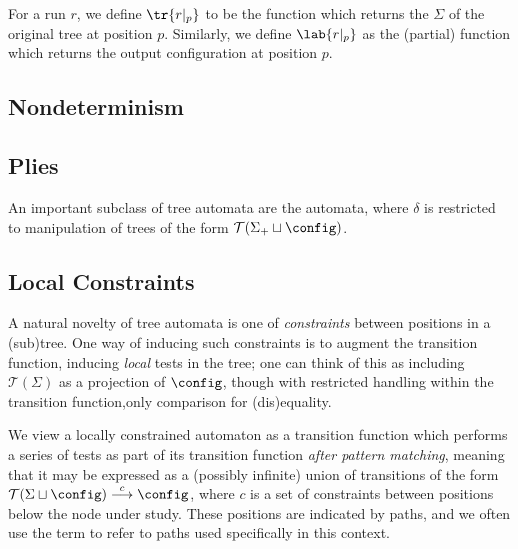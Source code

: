 For a run $r$, we define $\tr{r|_p}$ to be the function which returns the
$\Sigma$ of the original tree at position $p$.
Similarly, we define 
$\lab{r|_p}$ as the (partial) function which returns
the output configuration at position $p$.

\subsection{Nondeterminism}

\subsection{Plies}

An important subclass of tree automata are the  automata,
where $\delta$ is restricted to manipulation of trees of the form
$\mathcal{T}(\Sigma_+ \sqcup \config)$.

% 

\subsection{Local Constraints}
\label{sec:treeaut:con:loc}

A natural novelty of tree automata is one of {\em constraints} between
positions in a (sub)tree.  One way of inducing such constraints is to
augment the transition function, inducing {\em local} tests in the tree; one
can think of this as including $\mathcal{T}(\Sigma)$ as a projection of
$\config$, though with restricted handling within the transition
function,\eg only comparison for (dis)equality.

We view a locally constrained automaton as a transition function which
performs a series of tests as part of its transition function {\em after
pattern matching}, meaning that it may be expressed as a (possibly infinite)
union of transitions of the form $\mathcal{T}(\Sigma \sqcup \config)
\stackrel{c}{\longrightarrow} \config$, where $c$ is a set of constraints
between positions below the node under study.  These positions are indicated
by paths, and we often use the term  to refer to paths
used specifically in this context.

